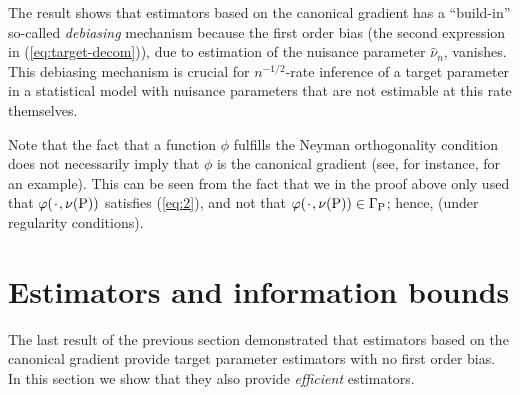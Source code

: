 \documentclass[a4,danish]{article}
\begin{document}
The result shows that estimators based on the canonical gradient has a ``build-in'' so-called
\textit{debiasing} mechanism because the first order bias (the second expression in
(\ref{eq:target-decom})), due to estimation of the nuisance parameter $\hat{\nu}_n$, vanishes. This
debiasing mechanism is crucial for $n^{-1/2}$-rate inference of a target parameter in a statistical
model with nuisance parameters that are not estimable at this rate themselves. 

Note that the fact that a function $\phi$ fulfills the Neyman orthogonality condition does not
necessarily imply that $\phi$ is the canonical gradient (see, for instance,
\cite{chernozhukov2016double} for an example). This can be seen from the fact that we in the proof
above only used that $\phi(\blank, \nu(\P))$ satisfies (\ref{eq:2}), and not that
$\phi(\blank, \nu(\P)) \in \Gamma_{\P}$; hence,  (under regularity
conditions).

\section{Estimators and information bounds}
\label{sec:estim-inform-bounds}

The last result of the previous section demonstrated that estimators based on the canonical gradient
provide target parameter estimators with no first order bias. In this section we show that they also
provide \textit{efficient} estimators. 



\end{document}
